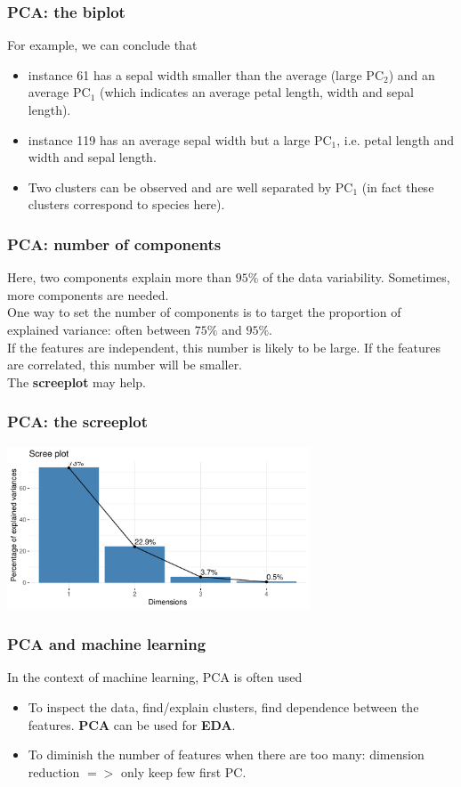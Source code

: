 \begin{frame}
\frametitle{PCA: the biplot}
For example, we can conclude that
\begin{itemize}
\item instance 61 has a sepal width smaller than the average (large PC$_2$) and an average PC$_1$ (which indicates an average petal length, width and sepal length).
\item instance 119 has an average sepal width but a large PC$_1$, i.e. petal length and width and sepal length.
\item Two clusters can be observed and are well separated by PC$_1$ (in fact these clusters correspond to species here).
\end{itemize}
\end{frame}
\begin{frame}
\frametitle{PCA: number of components}
Here, two components explain more than $95\%$ of the data variability. Sometimes, more components are needed.\\ 
\vspace{0.2cm}
One way to set the number of components is to target the proportion of explained variance: often between $75\%$ and $95\%$. \\
\vspace{0.2cm}
If the features are independent, this number is likely to be large. If the features are correlated, this number will be smaller.\\
\vspace{0.2cm}
The {\bf screeplot} may help.
\end{frame}
\begin{frame}
\frametitle{PCA: the screeplot}
\begin{center}
\includegraphics[width=9cm]{../../Graphs/Iris_scree.png}
\end{center}
\end{frame}
\begin{frame}
\frametitle{PCA and machine learning}
In the context of machine learning, PCA is often used 
\begin{itemize}
\item To inspect the data, find/explain clusters, find dependence between the features. {\bf PCA} can be used for {\bf EDA}.
\item To diminish the number of features when there are too many: dimension reduction $=>$ only keep few first PC.
\end{itemize}
\end{frame}
